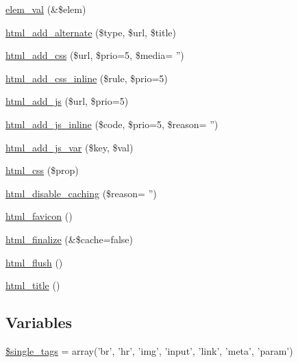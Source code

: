 \begin{DoxyCompactItemize}
\item 
\hyperlink{html_8inc_8php_ae28d850c3c906c6884462ca89c06f59b}{elem\_\-val} (\&\$elem)
\item 
\hyperlink{html_8inc_8php_ae013e8f0bdd681184ee1873a1964c454}{html\_\-add\_\-alternate} (\$type, \$url, \$title)
\item 
\hyperlink{html_8inc_8php_a962ef1b29e909a38b9a7b79086d54ab2}{html\_\-add\_\-css} (\$url, \$prio=5, \$media= '')
\item 
\hyperlink{html_8inc_8php_aae42f14c51b89215ad79b303ecb6e9e9}{html\_\-add\_\-css\_\-inline} (\$rule, \$prio=5)
\item 
\hyperlink{html_8inc_8php_a450214704e1bbc2e8849abb54db38a03}{html\_\-add\_\-js} (\$url, \$prio=5)
\item 
\hyperlink{html_8inc_8php_a9b9c28bfb08c81ccc10a3064b6775dc0}{html\_\-add\_\-js\_\-inline} (\$code, \$prio=5, \$reason= '')
\item 
\hyperlink{html_8inc_8php_a84769b7fe7b5454ff46534d0577eb54c}{html\_\-add\_\-js\_\-var} (\$key, \$val)
\item 
\hyperlink{html_8inc_8php_ad52276fa2a03df7342ba4b8e6a334ce0}{html\_\-css} (\$prop)
\item 
\hyperlink{html_8inc_8php_ab0dafe79ee61164014b0a4d8b4112dbb}{html\_\-disable\_\-caching} (\$reason= '')
\item 
\hyperlink{html_8inc_8php_a5738adf9b56d1ff2b8d02977ed7929ce}{html\_\-favicon} ()
\item 
\hyperlink{html_8inc_8php_a405dc7e3718d4196c05087057ebf69bf}{html\_\-finalize} (\&\$cache=false)
\item 
\hyperlink{html_8inc_8php_af8cd696bd10c945b09dae962d549b75b}{html\_\-flush} ()
\item 
\hyperlink{html_8inc_8php_a3f572f51a815fe19c590fea7d6d3a1a6}{html\_\-title} ()
\end{DoxyCompactItemize}
\subsection*{Variables}
\begin{DoxyCompactItemize}
\item 
\hyperlink{html_8inc_8php_a0a733c7a281726a879f13e7325881887}{\$single\_\-tags} = array('br', 'hr', 'img', 'input', 'link', 'meta', 'param')
\end{DoxyCompactItemize}


